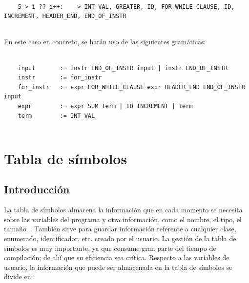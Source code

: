 \documentclass[11pt, english]{article}
\begin{document}
	\begin{lstlisting}
	
	5 > i ?? i++:	-> INT_VAL, GREATER, ID, FOR_WHILE_CLAUSE, ID, INCREMENT, HEADER_END, END_OF_INSTR
	
	\end{lstlisting}
	
	En este caso en concreto, se harán uso de las siguientes gramáticas:
	
	\begin{lstlisting}
	
	input 		:= instr END_OF_INSTR input | instr END_OF_INSTR
	instr 		:= for_instr
	for_instr	:= expr FOR_WHILE_CLAUSE expr HEADER_END END_OF_INSTR input
	expr 		:= expr SUM term | ID INCREMENT | term
	term		:= INT_VAL
	
	\end{lstlisting}
	
	\newpage
	
	\section{Tabla de símbolos}
	
	\subsection{Introducción}
	
	La tabla de símbolos almacena la información que en cada momento se necesita sobre las variables del programa y otra información, como el nombre, el tipo, el tamaño... También sirve para guardar información referente a cualquier clase, enumerado, identificador, etc. creado por el usuario.
	\newline
	La gestión de la tabla de símbolos es muy importante, ya que consume gran parte del tiempo de compilación; de ahí que su eficiencia sea crítica.
	\newline
	Respecto a las variables de usuario, la información que puede ser almacenada en la tabla de símbolos se divide en:
	
\end{document}
